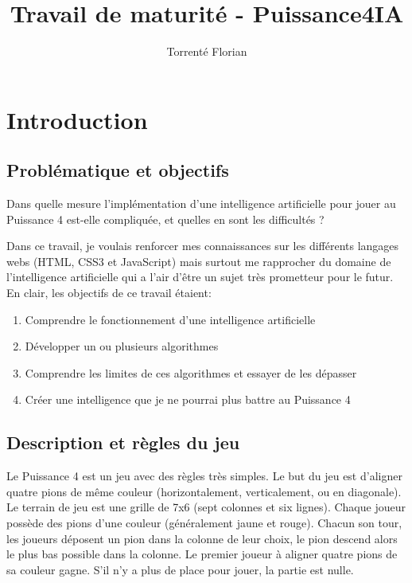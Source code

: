 \documentclass[a4paper]{article}
\author{Torrenté Florian}
\title{Travail de maturité - Puissance4IA}
\begin{document}
\maketitle

\tableofcontents

\newpage
\section{Introduction}

\subsection{Problématique et objectifs}
    Dans quelle mesure l'implémentation d'une intelligence artificielle pour jouer au Puissance 4 est-elle compliquée, et quelles en sont les difficultés ?

    Dans ce travail, je voulais renforcer mes connaissances sur les différents langages webs (HTML, CSS3 et JavaScript) mais surtout me rapprocher du domaine de l'intelligence artificielle qui a l'air d'être un sujet très prometteur pour le futur. En clair, les objectifs de ce travail étaient:
    \begin{enumerate}
        \item Comprendre le fonctionnement d'une intelligence artificielle
        \item Développer un ou plusieurs algorithmes
        \item Comprendre les limites de ces algorithmes et essayer de les dépasser
        \item Créer une intelligence que je ne pourrai plus battre au Puissance 4
    \end{enumerate}

\subsection{Description et règles du jeu}
    Le Puissance 4 est un jeu avec des règles très simples. Le but du jeu est d'aligner quatre pions de même couleur (horizontalement, verticalement, ou en diagonale). Le terrain de jeu est une grille de 7x6 (sept colonnes et six lignes). Chaque joueur possède des pions d'une couleur (généralement jaune et rouge). Chacun son tour, les joueurs déposent un pion dans la colonne de leur choix, le pion descend alors le plus bas possible dans la colonne. Le premier joueur à aligner quatre pions de sa couleur gagne. S'il n'y a plus de place pour jouer, la partie est nulle.
\end{document}
